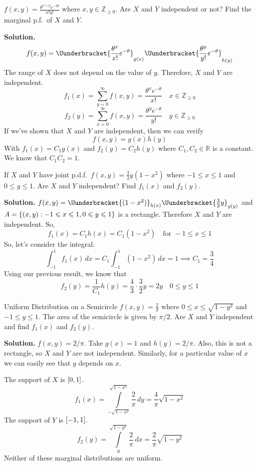 \begin{Example}{}{}
    $ \displaystyle f(x,y)=\frac{\theta^{x+y}e^{-2\theta}}{x!y!} $
    where $ x,y\in\mathbb{Z}_{\geqslant 0} $. Are $ X $ and $ Y $
    independent or not? Find the marginal p.f.\ of $ X $ and $ Y $.

    \textbf{Solution.}
    \[ f(x,y)=\Uunderbracket{\frac{\theta^x}{x!} e^{-\theta}}_{g(x)}
        \Uunderbracket{\frac{\theta^y}{y!}e^{-\theta} }_{h(y)} \]
    The range of $ X $ does not depend on the value of $ y $. Therefore,
    $ X $ and $ Y $ are independent.
    \[ f_1(x)=\sum\limits_{y=0}^{\infty} f(x,y)=\frac{\theta^x e^{-\theta}}{x!}\quad x\in
        \mathbb{Z}_{\geqslant 0} \]
    \[ f_2(y)=\sum\limits_{x=0}^{\infty} f(x,y)=\frac{\theta^y e^{-\theta}}{y!}\quad y\in
        \mathbb{Z}_{\geqslant 0} \]
    If we've shown that $ X $ and $ Y $ are independent, then we can verify
    \[ f(x,y)=g(x)h(y) \]
    With $ f_1(x)=C_1 g(x) $ and $ f_2(y)=C_2 h(y) $
    where $ C_1,C_2\in\mathbb{R} $ is a constant. We know that $ C_1C_2=1 $.
\end{Example}

\begin{Example}{}{}
    If $ X $ and $ Y $ have joint p.d.f.\
    $ \displaystyle  f(x,y)=\frac{3}{2} y(1-x^2) $
    where $ -1\leqslant x\leqslant 1 $ and $ 0\leqslant y\leqslant 1 $.
    Are $ X $ and $ Y $ independent? Find $ f_1(x) $ and $ f_2(y) $.

    \textbf{Solution.}
    $ f(x,y)=\Uunderbracket{(1-x^2)}_{h(x)} \Uunderbracket{\frac{3}{2} y}_{g(y)} $
    and $ A =\{(x,y):-1\leqslant x\leqslant 1,0\leqslant y\leqslant 1\} $
    is a rectangle. Therefore $ X $ and $ Y $ are independent. So,
    \[ f_1(x)=C_1h(x)=C_1(1-x^2)\quad\text{for }-1\leqslant x\leqslant 1 \]
    So, let's consider the integral:
    \[ \int_{-1}^{1} f_1(x)\, d{x} =C_1
        \int_{-1}^{1} (1-x^2)\, d{x} =1
        \implies C_1=\frac{3}{4} \]
    Using our previous result, we know that
    \[ f_2(y)=\frac{1}{C_1} h(y)=\frac{4}{3}\cdot \frac{3}{2} y=2y
        \quad 0\leqslant y\leqslant 1 \]
\end{Example}

\begin{Example}{Uniform Distribution on a Semicircle}{}
    $ \displaystyle f(x,y)=\frac{2}{\pi} $ where $ 0\leqslant x\leqslant \sqrt{1-y^2} $
    and $ -1\leqslant y\leqslant 1 $. The area of the semicircle
    is given by $ \pi/2 $. Are $ X $ and $ Y $ independent and find
    $ f_1(x) $ and $ f_2(y) $.

    \textbf{Solution.} $ f(x,y)=2/\pi $.
    Take $ g(x)=1 $ and $ h(y)=2/\pi $. Also,
    this is not a rectangle, so $ X $ and $ Y $ are not independent.
    Similarly, for a particular value of $ x $
    we can easily see that $ y $ depends on $ x $.

    The support of $ X $ is $ \interval{0}{1} $.
    \[ f_1(x)=\int\limits_{-\sqrt{1-x^2}}^{\sqrt{1-x^2}} \frac{2}{\pi} \, d{y}=
        \frac{4}{\pi}\sqrt{1-x^2}  \]
    The support of $ Y $ is $ \interval{-1}{1} $.
    \[ f_2(y)=
        \int\limits_{0}^{\sqrt{1-y^2}} \frac{2}{\pi} \, d{x}=
        \frac{2}{\pi} \sqrt{1-y^2}  \]
    Neither of these marginal distributions are uniform.
\end{Example}
